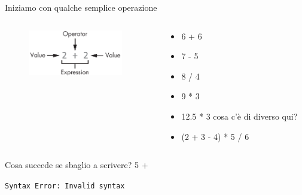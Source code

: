 \begin{frame}{Iniziamo con qualche semplice operazione}
	\begin{columns}
		\begin{column}{4cm}
			\begin{figure}
   				\includegraphics[height=2cm]{images/operatore_espressione.png}
			\end{figure}
		\end{column}
		\begin{column}{6cm}
            \begin{itemize}
                \item  6 + 6
                \item  7 - 5
                \item  8 / 4
                \item  9 * 3
                \item 12.5 * 3 cosa c'è di diverso qui?
                \item  (2 + 3 - 4) * 5 / 6 
            \end{itemize}
		\end{column}
	\end{columns}
	
	\begin{block}{Cosa succede se sbaglio a scrivere?}
	    5 +
	    
	    \lstinline{Syntax Error: Invalid syntax}
	\end{block}
\end{frame}